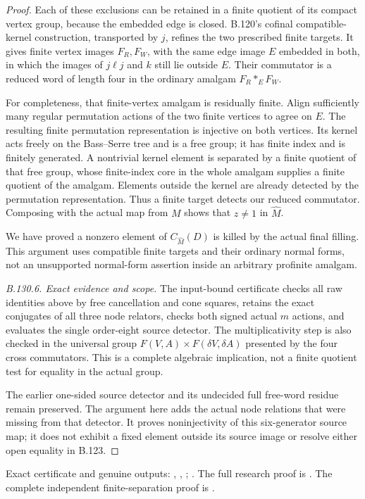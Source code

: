 \begin{proof}
Each of these exclusions can be retained in a finite quotient
of its compact vertex group, because the embedded edge is
closed. B.120's cofinal compatible-kernel construction,
transported by \(j\), refines the two prescribed finite
targets. It gives finite vertex images \(F_R,F_W\), with the
same edge image \(E\) embedded in both, in which the images of
\(j\ell j\) and \(k\) still lie outside \(E\).
Their commutator is a reduced word of length four in the
ordinary amalgam \(F_R*_E F_W\).

For completeness, that finite-vertex amalgam is residually
finite. Align sufficiently many regular permutation actions
of the two finite vertices to agree on \(E\). The resulting
finite permutation representation is injective on both
vertices. Its kernel acts freely on the Bass--Serre tree and
is a free group; it has finite index and is finitely generated.
A nontrivial kernel element is separated by a finite quotient
of that free group, whose finite-index core in the whole
amalgam supplies a finite quotient of the amalgam. Elements
outside the kernel are already detected by the permutation
representation. Thus a finite target detects our reduced
commutator. Composing with the actual map from \(M\) shows
that \(z\ne1\) in \(\widehat M\).

We have proved a nonzero element of
\(C_{\widehat M}(D)\) is killed by the actual final filling.
This argument uses compatible finite targets and their
ordinary normal forms, not an unsupported normal-form
assertion inside an arbitrary profinite amalgam.

\emph{B.130.6. Exact evidence and scope.}
The input-bound certificate checks all raw identities above by
free cancellation and cone squares, retains the exact conjugates
of all three node relators, checks both signed actual $m$ actions,
and evaluates the single order-eight source detector. The
multiplicativity step is also checked in the universal group
$F(V,A)\times F(\delta V,\delta A)$ presented by the four cross
commutators. This is a complete algebraic implication, not a
finite quotient test for equality in the actual group.

The earlier one-sided source detector and its undecided full
free-word residue remain preserved. The argument here adds the
actual node relations that were missing from that detector.
It proves noninjectivity of this six-generator source map;
it does not exhibit a fixed element outside its source image
or resolve either open equality in B.123.
\end{proof}

\begingroup\raggedright\footnotesize
Exact certificate and genuine outputs:
,
,
;
.
The full research proof is
.
The complete independent finite-separation proof is
.
\par\endgroup
